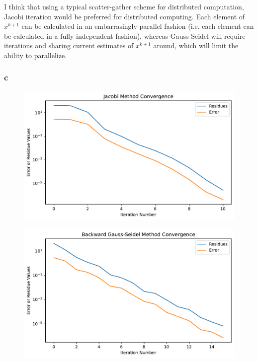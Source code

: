 \documentclass[11pt]{report}
\theoremstyle{definition}
\begin{document}
I think that using a typical scatter-gather scheme for distributed computation,
Jacobi iteration would be preferred for distributed computing. Each element of
$x^{k+1}$ can be calculated in an embarrasingly parallel fashion (i.e. each
element can be calculated in a fully independent fashion), whereas Gauss-Seidel
will require iterations and sharing current estimates of $x^{k+1}$ around, which
will limit the ability to parallelize.

\subsubsection*{c}
\begin{figure}[H]
	\center
	\includegraphics[width=.8\textwidth]{jacobi_iter.pdf}
\end{figure}
\begin{figure}[H]
	\center
	\includegraphics[width=.8\textwidth]{bgs_iter.pdf}
\end{figure}
\end{document}
